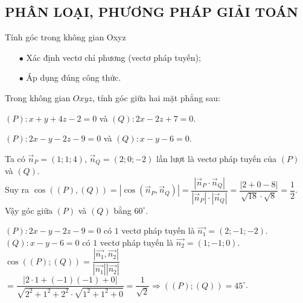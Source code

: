 \subsection{PHÂN LOẠI, PHƯƠNG PHÁP GIẢI TOÁN}
\begin{dang}{Tính góc trong không gian Oxyz}
	\begin{itemize}
		\item [$\bullet$] Xác định vectơ chỉ phương (vectơ pháp tuyến);
		\item [$\bullet$] Áp dụng đúng công thức.
	\end{itemize}
\end{dang}
\viduminhhoa
\setcounter{vd}{0}
\begin{vd}
	Trong không gian $Oxyz$, tính góc giữa hai mặt phẳng sau:
	\begin{enumEX}[a)]{1}
		\item $(P)\colon x+y+4z-2=0$ và $(Q)\colon 2x-2z+7=0$.
		\item $(P)\colon 2x - y-2z-9=0$ và $(Q)\colon  x - y - 6=0$.
	\end{enumEX}
	\loigiai
	{
	\begin{enumEX}[a)]{1}
		\item Ta có $\vec{n}_P=(1;1;4)$, $\vec{n}_Q=(2;0;-2)$ lần lượt là vectơ pháp tuyến của $(P)$ và $(Q)$.\\
		Suy ra $\cos\left((P),(Q)\right)=|\cos\left(\vec{n}_P,\vec{n}_Q\right)|=\dfrac{|\vec{n}_P\cdot \vec{n}_Q|}{|\vec{n}_P|\cdot |\vec{n}_Q|}=\dfrac{|2+0-8|}{\sqrt{18}\cdot \sqrt{8}}=\dfrac{1}{2}$.\\
		Vậy góc giữa $(P)$ và $(Q)$ bằng $60^\circ$.
		\item $(P)\colon 2x - y-2z-9=0$ có $1$ vectơ pháp tuyến là $\overrightarrow{n_1} = (2;-1;-2)$.\\
		$(Q)\colon  x - y - 6=0$ có $1$ vectơ pháp tuyến là $\overrightarrow{n_2} = (1;-1;0)$.\\
		$\cos \left(\left( P \right);\left( Q \right)\right) = \dfrac{\left|\overrightarrow{n_1}, \overrightarrow{n_2}\right|}{\left|\overrightarrow{n_1}\right|\left|\overrightarrow{n_2}\right|} $
		$= \dfrac{\left|2\cdot 1 + \left(- 1\right)\left(- 1\right) + 0\right|}{\sqrt{2^2 + 1^2 + 2^2}\cdot \sqrt{1^2+ 1^2 + 0}}= \dfrac{1}{\sqrt{2}} \Rightarrow \left(\left( P \right);\left( Q \right)\right) = 45^\circ$.
	\end{enumEX}
	}
\end{vd}
